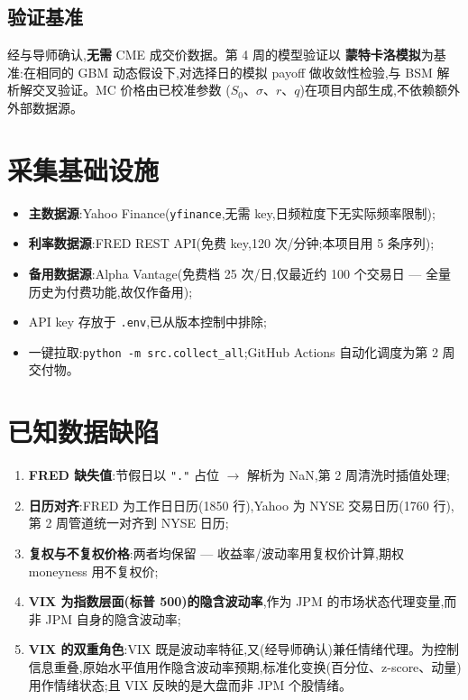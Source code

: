 \documentclass[11pt]{ctexart}
\begin{document}
\subsection{验证基准}
经与导师确认,\textbf{无需} CME 成交价数据。第 4 周的模型验证以
\textbf{蒙特卡洛模拟}为基准:在相同的 GBM 动态假设下,对选择日的模拟
payoff 做收敛性检验,与 BSM 解析解交叉验证。MC 价格由已校准参数
($S_0$、$\sigma$、$r$、$q$)在项目内部生成,不依赖额外外部数据源。

\section{采集基础设施}
\begin{itemize}
  \item \textbf{主数据源}:Yahoo Finance(\texttt{yfinance},无需 key,日频粒度下无实际频率限制);
  \item \textbf{利率数据源}:FRED REST API(免费 key,120 次/分钟;本项目用 5 条序列);
  \item \textbf{备用数据源}:Alpha Vantage(免费档 25 次/日,仅最近约 100 个交易日 --- 全量历史为付费功能,故仅作备用);
  \item API key 存放于 \texttt{.env},已从版本控制中排除;
  \item 一键拉取:\texttt{python -m src.collect\_all};GitHub Actions 自动化调度为第 2 周交付物。
\end{itemize}

\section{已知数据缺陷}
\begin{enumerate}
  \item \textbf{FRED 缺失值}:节假日以 \texttt{"."} 占位 $\to$ 解析为 NaN,第 2 周清洗时插值处理;
  \item \textbf{日历对齐}:FRED 为工作日日历(1850 行),Yahoo 为 NYSE 交易日历(1760 行),第 2 周管道统一对齐到 NYSE 日历;
  \item \textbf{复权与不复权价格}:两者均保留 --- 收益率/波动率用复权价计算,期权 moneyness 用不复权价;
  \item \textbf{VIX 为指数层面(标普 500)的隐含波动率},作为 JPM 的市场状态代理变量,而非 JPM 自身的隐含波动率;
  \item \textbf{VIX 的双重角色}:VIX 既是波动率特征,又(经导师确认)兼任情绪代理。为控制信息重叠,原始水平值用作隐含波动率预期,标准化变换(百分位、z-score、动量)用作情绪状态;且 VIX 反映的是大盘而非 JPM 个股情绪。
\end{enumerate}
\end{document}
